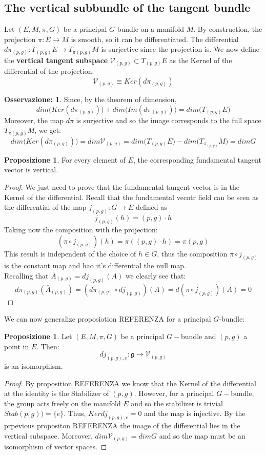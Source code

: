 \documentclass[12pt,a4paper]{report}
\theoremstyle{definition}
\theoremstyle{Theorem}
\newtheorem{Prop}[Def]{Proposizione}
\theoremstyle{definition}
\theoremstyle{definition}
\theoremstyle{definition}
\newtheorem{Obs}[Def]{Osservazione:}
\begin{document}
		\subsection{The vertical subbundle of the tangent bundle}
		Let $(E,M,\pi,G)$ be a principal $G$-bundle on a manifold $M$. By construction, the projection $\pi:E\rightarrow M$ is smooth, so it can be differentiated. The differential $d\pi_{(p,g)}:T_{(p,g)}E\rightarrow T_{\pi(p,g)}M$ is surjective since the projection is. We now define the \textbf{vertical tangent subspace} $\mathcal{V}_{(p,g)}\subset T_{(p,g)}E$ as the Kernel of the differential of the projection:
		$$\mathcal{V}_{(p,g)}\equiv Ker(d\pi_{(p,g)})$$
		\begin{Obs}
			Since, by the theorem of dimension, 
			$$dim \bigg(Ker(d\pi_{(p,g)})\bigg)+dim\bigg(Im(d\pi_{(p,g)})\bigg)=dim\bigg(T_{(p,g)}E\bigg)$$
			Moreover, the map $d\pi$ is surjective and so the image corresponds to the full space $T_{\pi(p,g)}M$, we get:
			$$dim \bigg(Ker(d\pi_{(p,g)})\bigg)=dim\mathcal{V}_{(p,g)}=dim\bigg(T_{(p,g)}E\bigg)-dim\bigg(T_{\pi_{(p,g)}}M\bigg)=dim G$$
		\end{Obs}
		\begin{Prop}
			For every element of $E$, the corresponding fundamental tangent vector is vertical.
		\end{Prop}
		\begin{proof}
			We just need to prove that the fundamental tangent vector is in the Kernel of the differential. Recall that the fundamental vecotr field can be seen as the differential of the map $j_{(p,g)}:G\rightarrow E$ defined as 
			$$j_{(p,g)}(h)=(p,g)\cdot h $$
			Taking now the composition with the projection:
			$$(\pi\circ j_{(p,g)})(h)=\pi((p,g)\cdot h)=\pi(p,g)$$
			This result is independent of the choice of $h\in G$, thus the composition $\pi\circ j_{(p,g)}$ is the constant map and hao it's differential the null map.\\
			Recalling that $\bar{A}_{(p,g)}=dj_{(p,g)}(A)$ we clearly see that:
			$$d\pi_{(p,g)}(\bar{A}_{(p,g)})=
			(d\pi_{(p,g)}\circ dj_{(p,g)})(A)=
			d(\pi\circ j_{(p,g)})(A)=0$$
		\end{proof}
		We can now generalize proposiotion REFERENZA for a principal $G$-bundle:
		\begin{Prop}
			Let $(E,M,\pi,G)$ be a principal $G-$bundle and $(p,g)$ a point in $E$. Then: 
			$$dj_{(p,g),e}:\mathfrak{g}\rightarrow \mathcal{V}_{(p,g)}$$ is an isomorphism.
		\end{Prop}
		\begin{proof}
			By proposition REFERENZA we know that the Kernel of the differential at the identity is the Stabilizer of $(p,g)$. However, for a principal $G-$bundle, the group acts freely on the manifold $E$ and so the stabilizer is trivial $Stab(p,g))=\{e\}$. Thus, $Ker dj_{(p,g),e}=0$ and the map is injective. By the prpevious propositon REFERENZA the image of the differential lies in the vertical subspace. Moreover, $dim\mathcal{V}_{(p,g)}=dim G$ and so the map must be an isomorphism of vector spaces.			
		\end{proof}
\end{document}
